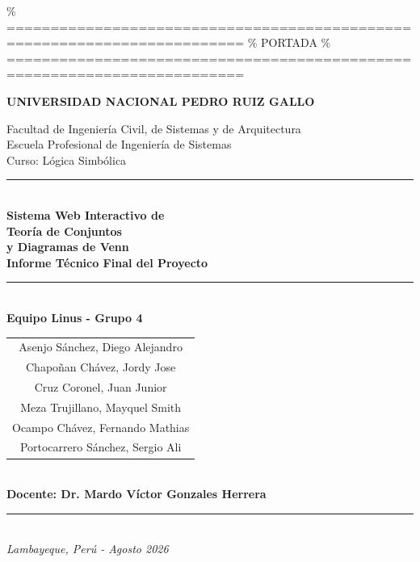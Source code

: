 \documentclass[11pt,a4paper]{article}
\begin{document}
\% =========================================================================
\% PORTADA
\% =========================================================================
\begin{titlepage}
    \centering
    \begin{tcolorbox}[colback=bannerblue,coltext=white,sharp corners,boxrule=0pt,halign=center,top=8pt,bottom=8pt]
        \bfseries\large UNIVERSIDAD NACIONAL PEDRO RUIZ GALLO
    \end{tcolorbox}
    
    \vspace{0.6cm}
    {\large Facultad de Ingeniería Civil, de Sistemas y de Arquitectura}\\[0.2cm]
    {\large Escuela Profesional de Ingeniería de Sistemas}\\[0.2cm]
    {\large Curso: Lógica Simbólica}\\[1.2cm]
    
    \rule{\textwidth}{1.5pt}\\[0.6cm]
    {\Huge\bfseries Sistema Web Interactivo de\\[0.3cm] Teoría de Conjuntos\\[0.3cm] y Diagramas de Venn}\\[0.6cm]
    {\Large\bfseries Informe Técnico Final del Proyecto}\\[0.6cm]
    \rule{\textwidth}{1.5pt}\\[1.2cm]
    
    {\large\bfseries Equipo Linus - Grupo 4}\\[0.5cm]
    \begin{tabular}{c}
        Asenjo Sánchez, Diego Alejandro \\
        Chapoñan Chávez, Jordy Jose \\
        Cruz Coronel, Juan Junior \\
        Meza Trujillano, Mayquel Smith \\
        Ocampo Chávez, Fernando Mathias \\
        Portocarrero Sánchez, Sergio Ali
    \end{tabular}\\[1.0cm]
    
    {\textbf{Docente: Dr. Mardo Víctor Gonzales Herrera}}\\[1.2cm]
    
    \vfill
    \rule{\textwidth}{0.8pt}\\[0.2cm]
    {\textit{Lambayeque, Perú - Agosto 2026}}
\end{titlepage}
\end{document}
